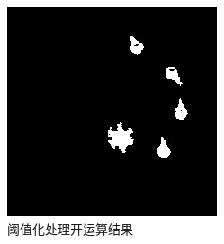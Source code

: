 \documentclass[a4paper]{ctexart}
\begin{document}
\begin{enumerate}[label=\arabic*、]
\begin{enumerate}[label=\alph*)]
\begin{figure}[htbp]
\begin{minipage}[t]{0.25\textwidth}
				\includegraphics[width=\textwidth]{figure/open_1/img5.jpg}
			\end{minipage}
			\caption{阈值化处理开运算结果}\label{fig:阈值化开运算}
		\end{figure}
		

\end{enumerate}
\end{enumerate}
\end{document}
